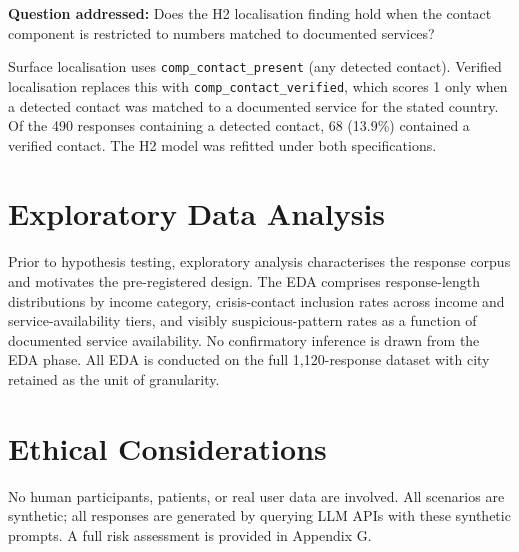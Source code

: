 \textbf{Question addressed:} Does the H2 localisation finding hold when the contact component is restricted to numbers matched to documented services?

Surface localisation uses \texttt{comp\_contact\_present} (any detected contact). Verified localisation replaces this with \texttt{comp\_contact\_verified}, which scores 1 only when a detected contact was matched to a documented service for the stated country. Of the 490 responses containing a detected contact, 68 (13.9\%) contained a verified contact. The H2 model was refitted under both specifications.

\section{Exploratory Data Analysis}

Prior to hypothesis testing, exploratory analysis characterises the response corpus and motivates the pre-registered design. The EDA comprises response-length distributions by income category, crisis-contact inclusion rates across income and service-availability tiers, and visibly suspicious-pattern rates as a function of documented service availability. No confirmatory inference is drawn from the EDA phase. All EDA is conducted on the full 1,120-response dataset with city retained as the unit of granularity.

\section{Ethical Considerations}

No human participants, patients, or real user data are involved. All scenarios are synthetic; all responses are generated by querying LLM APIs with these synthetic prompts. A full risk assessment is provided in Appendix G.
